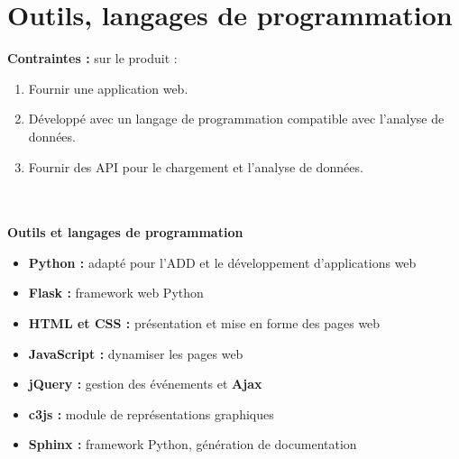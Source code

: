 	\section{Outils, langages de programmation} 
		\begin{frame} 
			\textbf{Contraintes :} sur le produit :
			\begin{enumerate}
				\item Fournir une application web.
				\item Développé avec un langage de programmation compatible avec l’analyse de données.
				\item Fournir des API pour le chargement et l’analyse de données.
			\end{enumerate}
			~\\~\\
			\pause
			\textbf{Outils et langages de programmation}
			\begin{itemize}
				\item \textbf{Python :} adapté pour l’ADD et le développement d’applications web
				\item \textbf{Flask :} framework web Python
				\item \textbf{HTML et CSS :} présentation et mise en forme des pages web
				\item \textbf{JavaScript :} dynamiser les pages web
				\item \textbf{jQuery :} gestion des événements et \textbf{Ajax}
				\item \textbf{c3js :} module de représentations graphiques
				\item \textbf{Sphinx :} framework Python, génération de documentation
			\end{itemize}
		\end{frame}
	

